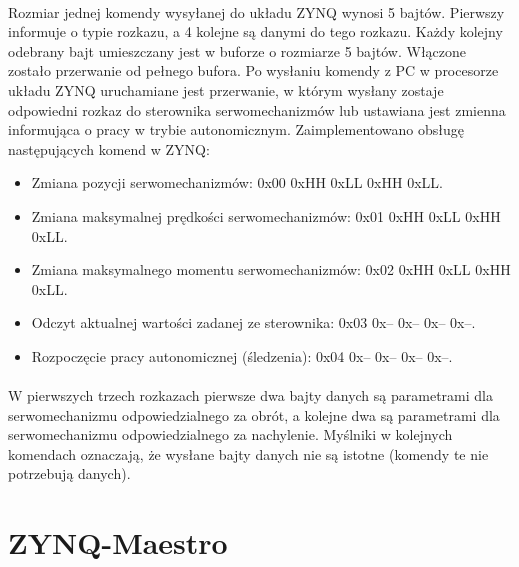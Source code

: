 \paragraph*{}
Rozmiar jednej komendy wysyłanej do układu ZYNQ wynosi 5 bajtów. Pierwszy informuje o typie rozkazu, a 4 kolejne są danymi do tego rozkazu. Każdy kolejny odebrany bajt umieszczany jest w buforze o rozmiarze 5 bajtów. Włączone zostało przerwanie od pełnego bufora. Po wysłaniu komendy z PC w procesorze układu ZYNQ uruchamiane jest przerwanie, w którym wysłany zostaje odpowiedni rozkaz do sterownika serwomechanizmów lub ustawiana jest zmienna informująca o pracy w trybie autonomicznym. Zaimplementowano obsługę następujących komend w ZYNQ:
\begin{itemize}
\item Zmiana pozycji serwomechanizmów: 0x00 0xHH 0xLL 0xHH 0xLL.
\item Zmiana maksymalnej prędkości serwomechanizmów: 0x01 0xHH 0xLL 0xHH 0xLL.
\item Zmiana maksymalnego momentu serwomechanizmów: 0x02 0xHH 0xLL 0xHH 0xLL.
\item Odczyt aktualnej wartości zadanej ze sterownika: 0x03 0x-- 0x-- 0x-- 0x--.
\item Rozpoczęcie pracy autonomicznej (śledzenia): 0x04 0x-- 0x-- 0x-- 0x--.
\end{itemize}
\paragraph*{}
W pierwszych trzech rozkazach pierwsze dwa bajty danych są parametrami dla serwomechanizmu odpowiedzialnego za obrót, a kolejne dwa są parametrami dla serwomechanizmu odpowiedzialnego za nachylenie. Myślniki w kolejnych komendach oznaczają, że wysłane bajty danych nie są istotne (komendy te nie potrzebują danych).

\section{ZYNQ-Maestro}
\label{sec:zynq-maestro}


